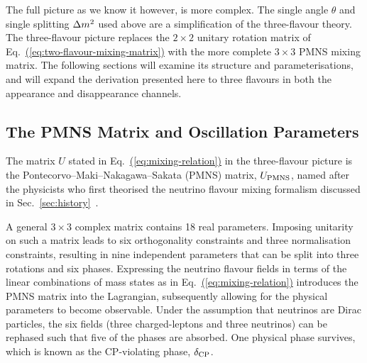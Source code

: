The full picture as we know it however, is more complex. The single angle $\theta$ and single splitting $\Delta m^{2}_{}$ used above are a simplification of the three-flavour theory. The three-flavour picture replaces the $2\times2$ unitary rotation matrix of Eq.~\hyperref[eq:two-flavour-mixing-matrix]{(\ref{eq:two-flavour-mixing-matrix})} with the more complete $3\times3$ PMNS mixing matrix. The following sections will examine its structure and parameterisations, and will expand the derivation presented here to three flavours in both the appearance and disappearance channels.

\subsection{The PMNS Matrix and Oscillation Parameters}
\label{sec:pmns}


The matrix $U$ stated in Eq.~\hyperref[eq:mixing-relation]{(\ref{eq:mixing-relation})} in the three-flavour picture is the Pontecorvo--Maki--Nakagawa--Sakata (PMNS) matrix, $U_{\rm PMNS}$, named after the physicists who first theorised the neutrino flavour mixing formalism discussed in Sec.~\ref{sec:history}~\cite{Pontecorvo1957,MakiNakagawaSakata1962,Pontecorvo1967}.

A general $3\times 3$ complex matrix contains 18 real parameters. Imposing unitarity on such a matrix leads to six orthogonality constraints and three normalisation constraints, resulting in nine independent parameters that can be split into three rotations and six phases.
Expressing the neutrino flavour fields in terms of the linear combinations of mass states as in Eq.~\hyperref[eq:mixing-relation]{(\ref{eq:mixing-relation})} introduces the PMNS matrix into the Lagrangian, subsequently allowing for the physical parameters to become observable. 
Under the assumption that neutrinos are Dirac particles, the six fields (three charged-leptons and three neutrinos) can be rephased such that five of the phases are absorbed.
One physical phase survives, which is known as the CP-violating phase, $\delta_{\rm CP}$.


